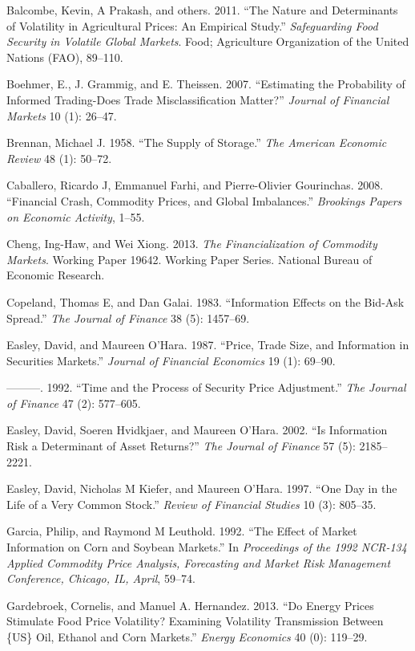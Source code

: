 \documentclass[review,12pt]{elsarticle}
\begin{document}
Balcombe, Kevin, A Prakash, and others. 2011. ``The Nature and
Determinants of Volatility in Agricultural Prices: An Empirical Study.''
\emph{Safeguarding Food Security in Volatile Global Markets}. Food;
Agriculture Organization of the United Nations (FAO), 89--110.

Boehmer, E., J. Grammig, and E. Theissen. 2007. ``Estimating the
Probability of Informed Trading-Does Trade Misclassification Matter?''
\emph{Journal of Financial Markets} 10 (1): 26--47.

Brennan, Michael J. 1958. ``The Supply of Storage.'' \emph{The American
Economic Review} 48 (1): 50--72.

Caballero, Ricardo J, Emmanuel Farhi, and Pierre-Olivier Gourinchas.
2008. ``Financial Crash, Commodity Prices, and Global Imbalances.''
\emph{Brookings Papers on Economic Activity}, 1--55.

Cheng, Ing-Haw, and Wei Xiong. 2013. \emph{The Financialization of
Commodity Markets}. Working Paper 19642. Working Paper Series. National
Bureau of Economic Research.

Copeland, Thomas E, and Dan Galai. 1983. ``Information Effects on the
Bid-Ask Spread.'' \emph{The Journal of Finance} 38 (5): 1457--69.

Easley, David, and Maureen O'Hara. 1987. ``Price, Trade Size, and
Information in Securities Markets.'' \emph{Journal of Financial
Economics} 19 (1): 69--90.

---------. 1992. ``Time and the Process of Security Price Adjustment.''
\emph{The Journal of Finance} 47 (2): 577--605.

Easley, David, Soeren Hvidkjaer, and Maureen O'Hara. 2002. ``Is
Information Risk a Determinant of Asset Returns?'' \emph{The Journal of
Finance} 57 (5): 2185--2221.

Easley, David, Nicholas M Kiefer, and Maureen O'Hara. 1997. ``One Day in
the Life of a Very Common Stock.'' \emph{Review of Financial Studies} 10
(3): 805--35.

Garcia, Philip, and Raymond M Leuthold. 1992. ``The Effect of Market
Information on Corn and Soybean Markets.'' In \emph{Proceedings of the
1992 NCR-134 Applied Commodity Price Analysis, Forecasting and Market
Risk Management Conference, Chicago, IL, April}, 59--74.

Gardebroek, Cornelis, and Manuel A. Hernandez. 2013. ``Do Energy Prices
Stimulate Food Price Volatility? Examining Volatility Transmission
Between \{US\} Oil, Ethanol and Corn Markets.'' \emph{Energy Economics}
40 (0): 119--29.
\end{document}
